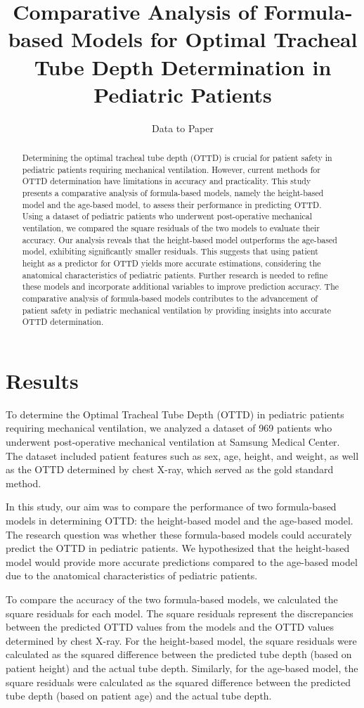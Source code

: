 \documentclass[11pt]{article}
\title{Comparative Analysis of Formula-based Models for Optimal Tracheal Tube Depth Determination in Pediatric Patients}
\author{Data to Paper}
\begin{document}
\maketitle
\begin{abstract}
Determining the optimal tracheal tube depth (OTTD) is crucial for patient safety in pediatric patients requiring mechanical ventilation. However, current methods for OTTD determination have limitations in accuracy and practicality. This study presents a comparative analysis of formula-based models, namely the height-based model and the age-based model, to assess their performance in predicting OTTD. Using a dataset of pediatric patients who underwent post-operative mechanical ventilation, we compared the square residuals of the two models to evaluate their accuracy. Our analysis reveals that the height-based model outperforms the age-based model, exhibiting significantly smaller residuals. This suggests that using patient height as a predictor for OTTD yields more accurate estimations, considering the anatomical characteristics of pediatric patients. Further research is needed to refine these models and incorporate additional variables to improve prediction accuracy. The comparative analysis of formula-based models contributes to the advancement of patient safety in pediatric mechanical ventilation by providing insights into accurate OTTD determination.
\end{abstract}
\section*{Results}

To determine the Optimal Tracheal Tube Depth (OTTD) in pediatric patients requiring mechanical ventilation, we analyzed a dataset of 969 patients who underwent post-operative mechanical ventilation at Samsung Medical Center. The dataset included patient features such as sex, age, height, and weight, as well as the OTTD determined by chest X-ray, which served as the gold standard method.

In this study, our aim was to compare the performance of two formula-based models in determining OTTD: the height-based model and the age-based model. The research question was whether these formula-based models could accurately predict the OTTD in pediatric patients. We hypothesized that the height-based model would provide more accurate predictions compared to the age-based model due to the anatomical characteristics of pediatric patients.

To compare the accuracy of the two formula-based models, we calculated the square residuals for each model. The square residuals represent the discrepancies between the predicted OTTD values from the models and the OTTD values determined by chest X-ray. For the height-based model, the square residuals were calculated as the squared difference between the predicted tube depth (based on patient height) and the actual tube depth. Similarly, for the age-based model, the square residuals were calculated as the squared difference between the predicted tube depth (based on patient age) and the actual tube depth.
\end{document}
